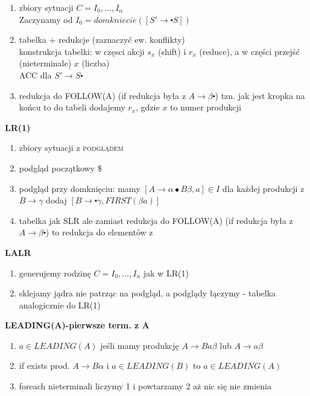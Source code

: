 \begin{multicols}{3}
    \begin{enumerate}
      \item zbiory sytuacji $C = I_0, \dots, I_n $ \\ Zaczynamy od $I_0 = domkniecie([S' \rightarrow \centerdot S])$
      \item tabelka + redukcje (zaznaczyć ew. konflikty) \\
            konstrukcja tabelki: w częsci akcji $s_x$ (shift) i $r_x$ (reduce), a w części przejść (nieterminale) $x$ (liczba) \\
            ACC dla $S' \rightarrow S  \centerdot $
      \item redukcja do FOLLOW(A) (if redukcja była z $A\rightarrow \beta \centerdot$) tzn. jak jest kropka na końcu to do tabeli dodajemy $r_x$, gdzie $x$ to numer produkcji
    \end{enumerate}
    \textbf{LR(1)}
    \begin{enumerate}
      \item zbiory sytuacji z \textsc{podglądem}
      \item podgląd początkowy \$
      \item podgląd przy domknięciu: mamy $[A\rightarrow \alpha \bullet B \beta , a] \in I$ 
          dla każdej produkcji z $B\rightarrow \gamma$ dodaj 
          $[B\rightarrow \centerdot \gamma ,FIRST(\beta a)]$
      \item tabelka jak SLR ale zamiast redukcja do FOLLOW(A) (if redukcja była z $A\rightarrow \beta \centerdot$) to redukcja do elementów z 
    \end{enumerate}	
    \textbf{LALR}
    \begin{enumerate}
      \item generujemy rodzinę $ C = I_0, \dots, I_n $ jak w LR(1)
      \item sklejamy jądra nie patrząc na podgląd, a podglądy łączymy - tabelka analogicznie do LR(1)
    \end{enumerate}	
    \textbf{LEADING(A)-pierwsze term. z A}
    \begin{enumerate}
      \item	$a \in LEADING(A)$ jeśli mamy produkcję $A\rightarrow Ba\beta$ lub $A \rightarrow a \beta$ 
      \item if exists prod. $A\rightarrow B\alpha$ i $a \in LEADING(B)$ to $a \in LEADING(A)$
      \item foreach nieterminali liczymy 1 i powtarzamy 2 aż nic się nie zmienia
    \end{enumerate}

\end{multicols}
